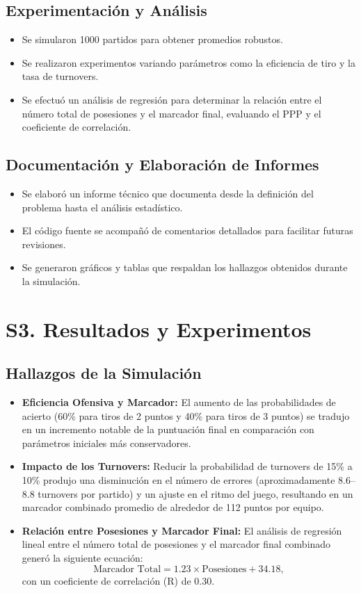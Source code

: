 \documentclass[12pt]{article}
\begin{document}
\subsection{Experimentación y Análisis}
\begin{itemize}
	\item Se simularon 1000 partidos para obtener promedios robustos.
	\item Se realizaron experimentos variando parámetros como la eficiencia de tiro y la tasa de turnovers.
	\item Se efectuó un análisis de regresión para determinar la relación entre el número total de posesiones y el marcador final, evaluando el PPP y el coeficiente de correlación.
\end{itemize}

\subsection{Documentación y Elaboración de Informes}
\begin{itemize}
	\item Se elaboró un informe técnico que documenta desde la definición del problema hasta el análisis estadístico.
	\item El código fuente se acompañó de comentarios detallados para facilitar futuras revisiones.
	\item Se generaron gráficos y tablas que respaldan los hallazgos obtenidos durante la simulación.
\end{itemize}

\newpage

\section{S3. Resultados y Experimentos}

\subsection{Hallazgos de la Simulación}
\begin{itemize}
	\item \textbf{Eficiencia Ofensiva y Marcador:} El aumento de las probabilidades de acierto (60\% para tiros de 2 puntos y 40\% para tiros de 3 puntos) se tradujo en un incremento notable de la puntuación final en comparación con parámetros iniciales más conservadores.
	\item \textbf{Impacto de los Turnovers:} Reducir la probabilidad de turnovers de 15\% a 10\% produjo una disminución en el número de errores (aproximadamente 8.6--8.8 turnovers por partido) y un ajuste en el ritmo del juego, resultando en un marcador combinado promedio de alrededor de 112 puntos por equipo.
	\item \textbf{Relación entre Posesiones y Marcador Final:} El análisis de regresión lineal entre el número total de posesiones y el marcador final combinado generó la siguiente ecuación:
	      \[
		      \text{Marcador Total} = 1.23 \times \text{Posesiones} + 34.18,
	      \]
	      con un coeficiente de correlación (R) de 0.30.
\end{itemize}
\end{document}

